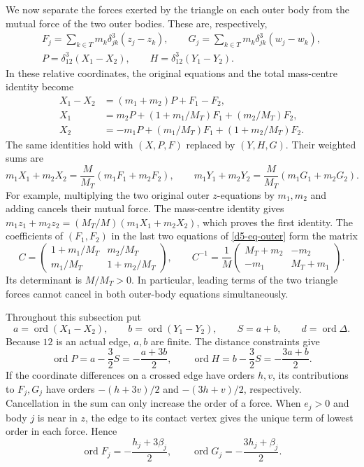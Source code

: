 \documentclass[Threeside,11pt]{article}
\theoremstyle{definition}
\theoremstyle{remark}
\numberwithin{equation}{section}
\theoremstyle{remark}
\newcommand{\ord}{\operatorname{ord}}
\begin{document}
{We now separate the forces exerted by the triangle on each outer body from
the mutual force of the two outer bodies.  These are, respectively,
\[
 \begin{gathered}
 F_j=\sum_{k\in T}m_k\delta_{jk}^3(z_j-z_k),\qquad
 G_j=\sum_{k\in T}m_k\delta_{jk}^3(w_j-w_k),\\
 P=\delta_{12}^3(X_1-X_2),\qquad H=\delta_{12}^3(Y_1-Y_2).
 \end{gathered}
\]
In these relative coordinates, the original equations and the total
mass-centre identity become
\begin{equation}\label{d5-eq-outer}
 \begin{aligned}
 X_1-X_2&=(m_1+m_2)P+F_1-F_2,\\
 X_1&=m_2P+(1+m_1/M_T)F_1+(m_2/M_T)F_2,\\
 X_2&=-m_1P+(m_1/M_T)F_1+(1+m_2/M_T)F_2.
 \end{aligned}
\end{equation}
The same identities hold with $(X,P,F)$ replaced by $(Y,H,G)$.  Their weighted
sums are
\begin{equation}\label{d5-eq-centre}
 m_1X_1+m_2X_2=\frac M{M_T}(m_1F_1+m_2F_2),\qquad
 m_1Y_1+m_2Y_2=\frac M{M_T}(m_1G_1+m_2G_2).
\end{equation}
For example, multiplying the two original outer $z$-equations by $m_1,m_2$
and adding cancels their mutual force.  The mass-centre identity gives
$m_1z_1+m_2z_2=(M_T/M)(m_1X_1+m_2X_2)$, which proves the first identity.
The coefficients of $(F_1,F_2)$ in the last two equations of
\eqref{d5-eq-outer} form the matrix
\begin{equation}\label{d5-eq-force-matrix}
 C=\begin{pmatrix}1+m_1/M_T&m_2/M_T\\m_1/M_T&1+m_2/M_T\end{pmatrix},
 \qquad
 C^{-1}=\frac1M\begin{pmatrix}M_T+m_2&-m_2\\-m_1&M_T+m_1\end{pmatrix}.
\end{equation}
Its determinant is $M/M_T>0$.  In particular, leading terms of the two
triangle forces cannot cancel in both outer-body equations simultaneously.

Throughout this subsection put
\[
 a=\ord(X_1-X_2),\qquad b=\ord(Y_1-Y_2),\qquad S=a+b,
 \qquad d=\ord\Delta.
\]
Because $12$ is an actual edge, $a,b$ are finite.  The distance constraints give
\begin{equation}\label{d5-eq-pair-orders}
 \ord P=a-\frac32S=-\frac{a+3b}{2},\qquad
 \ord H=b-\frac32S=-\frac{3a+b}{2}.
\end{equation}
If the coordinate differences on a crossed edge have orders $h,v$, its
contributions to $F_j,G_j$ have orders $-(h+3v)/2$ and $-(3h+v)/2$,
respectively.  Cancellation in the sum can only increase the order of a
force.  When $e_j>0$ and body $j$ is near in $z$, the edge to its contact vertex gives
the unique term of lowest order in each force.  Hence
\begin{equation}\label{d5-eq-special-force}
 \ord F_j=-\frac{h_j+3\beta_j}{2},\qquad
 \ord G_j=-\frac{3h_j+\beta_j}{2}.
\end{equation}

}
\end{document}
